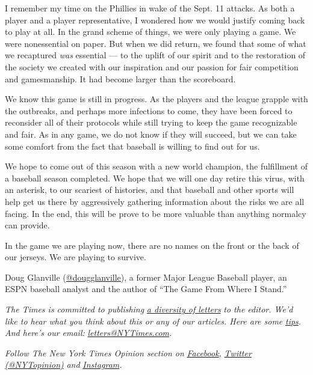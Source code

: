 I remember my time on the Phillies in wake of the Sept. 11 attacks. As
both a player and a player representative, I wondered how we would
justify coming back to play at all. In the grand scheme of things, we
were only playing a game. We were nonessential on paper. But when we did
return, we found that some of what we recaptured \emph{was} essential
--- to the uplift of our spirit and to the restoration of the society we
created with our inspiration and our passion for fair competition and
gamesmanship. It had become larger than the scoreboard.

We know this game is still in progress. As the players and the league
grapple with the outbreaks, and perhaps more infections to come, they
have been forced to reconsider all of their protocols while still trying
to keep the game recognizable and fair. As in any game, we do not know
if they will succeed, but we can take some comfort from the fact that
baseball is willing to find out for us.

We hope to come out of this season with a new world champion, the
fulfillment of a baseball season completed. We hope that we will one day
retire this virus, with an asterisk, to our scariest of histories, and
that baseball and other sports will help get us there by aggressively
gathering information about the risks we are all facing. In the end,
this will be prove to be more valuable than anything normalcy can
provide.

In the game we are playing now, there are no names on the front or the
back of our jerseys. We are playing to survive.

Doug Glanville
(\href{https://twitter.com/dougglanville}{@dougglanville}), a former
Major League Baseball player, an ESPN baseball analyst and the author of
``The Game From Where I Stand.''

\emph{The Times is committed to publishing}
\href{https://www.nytimes3xbfgragh.onion/2019/01/31/opinion/letters/letters-to-editor-new-york-times-women.html}{\emph{a
diversity of letters}} \emph{to the editor. We'd like to hear what you
think about this or any of our articles. Here are some}
\href{https://help.nytimes3xbfgragh.onion/hc/en-us/articles/115014925288-How-to-submit-a-letter-to-the-editor}{\emph{tips}}\emph{.
And here's our email:}
\href{mailto:letters@NYTimes.com}{\emph{letters@NYTimes.com}}\emph{.}

\emph{Follow The New York Times Opinion section on}
\href{https://www.facebookcorewwwi.onion/nytopinion}{\emph{Facebook}}\emph{,}
\href{http://twitter.com/NYTOpinion}{\emph{Twitter (@NYTopinion)}}
\emph{and}
\href{https://www.instagram.com/nytopinion/}{\emph{Instagram}}\emph{.}

